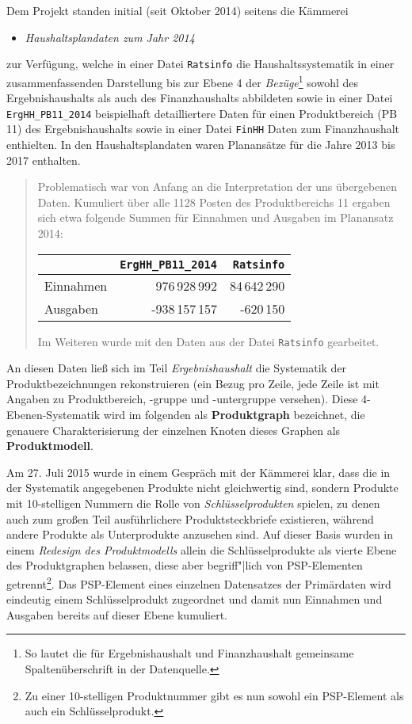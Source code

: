 \documentclass[a4paper,11pt,twoside]{article}
\begin{document}
Dem Projekt standen initial (seit Oktober 2014) seitens die Kämmerei
\begin{itemize}
\item[(1)] \emph{Haushaltsplandaten zum Jahr 2014}
\end{itemize}
zur Verfügung, welche in einer Datei \texttt{Ratsinfo} die Haushaltssystematik
in einer zusammenfassenden Darstellung bis zur Ebene 4 der
\emph{Bezüge}\footnote{So lautet die für Ergebnishaushalt und Finanzhaushalt
  gemeinsame Spaltenüberschrift in der Datenquelle.}  sowohl des
Ergebnishaushalts als auch des Finanzhaushalts abbildeten sowie in einer Datei
\texttt{ErgHH\_PB11\_2014} beispielhaft detailliertere Daten für einen
Produktbereich (PB 11) des Ergebnishaushalts sowie in einer Datei
\texttt{FinHH} Daten zum Finanzhaushalt enthielten. In den Haushaltsplandaten
waren Planansätze für die Jahre 2013 bis 2017 enthalten.
\begin{quote}
  Problematisch war von Anfang an die Interpretation der uns übergebenen Daten.
  Kumuliert über alle 1128 Posten des Produktbereichs 11 ergaben sich etwa
  folgende Summen für Einnahmen und Ausgaben im Planansatz 2014:
  \begin{center}
    \begin{tabular}{l|r|r}
      & \texttt{ErgHH\_PB11\_2014}& \texttt{Ratsinfo}\\\hline
      Einnahmen & 976\,928\,992 & 84\,642\,290 \\
      Ausgaben & -938\,157\,157 & -620\,150
    \end{tabular}
  \end{center}
Im Weiteren wurde mit den Daten aus der Datei \texttt{Ratsinfo} gearbeitet. 
\end{quote}

An diesen Daten ließ sich im Teil \emph{Ergebnishaushalt} die Systematik der
Produktbezeichnungen rekonstruieren (ein Bezug pro Zeile, jede Zeile ist mit
Angaben zu Produktbereich, -gruppe und -untergruppe versehen).  Diese
4-Ebenen-Systematik wird im folgenden als \textbf{Produktgraph} bezeichnet, die
genauere Charakterisierung der einzelnen Knoten dieses Graphen als
\textbf{Produktmodell}. 

Am 27. Juli 2015 wurde in einem Gespräch mit der Kämmerei klar, dass die in der
Systematik angegebenen Produkte nicht gleichwertig sind, sondern Produkte mit
10-stelligen Nummern die Rolle von \emph{Schlüsselprodukten} spielen, zu denen
auch zum großen Teil ausführlichere Produktsteckbriefe existieren, während
andere Produkte als Unterprodukte anzusehen sind. Auf dieser Basis wurden in
einem \emph{Redesign des Produktmodells} allein die Schlüsselprodukte als
vierte Ebene des Produktgraphen belassen, diese aber begriff"|lich von
PSP-Elementen getrennt\footnote{Zu einer 10-stelligen Produktnummer gibt es nun
  sowohl ein PSP-Element als auch ein Schlüsselprodukt.}. Das PSP-Element eines
einzelnen Datensatzes der Primärdaten wird eindeutig einem Schlüsselprodukt
zugeordnet und damit nun Einnahmen und Ausgaben bereits auf dieser Ebene
kumuliert.
\end{document}
